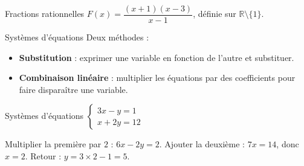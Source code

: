 \documentclass[aspectratio=169,10pt]{beamer}
\begin{document}
\begin{frame}{Fractions rationnelles}
\(F(x) = \dfrac{(x+1)(x-3)}{x-1}\), définie sur \(\mathbb{R}\setminus\{1\}\).
\end{frame}
\begin{frame}{Systèmes d'équations}
Deux méthodes :

\begin{itemize}

  \item \textbf{Substitution} : exprimer une variable en fonction de l'autre
        et substituer.
  
\item \textbf{Combinaison linéaire} : multiplier les équations par des
        coefficients pour faire disparaître une variable.

\end{itemize}
\end{frame}
\begin{frame}{Systèmes d'équations}
\(\begin{cases}3x - y = 1 \\ x + 2y = 12\end{cases}\)

Multiplier la première par \(2\) : \(6x - 2y = 2\).
Ajouter la deuxième : \(7x = 14\), donc \(x=2\).
Retour : \(y = 3\times2-1 = 5\).
\end{frame}
\end{document}

